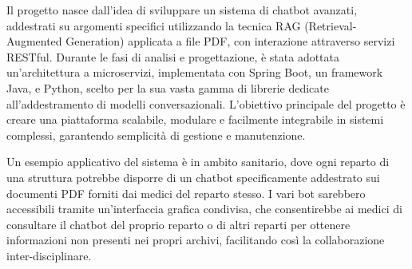\documentclass[a4paper,twoside,12pt]{toptesi}
\begin{document}
Il progetto nasce dall'idea di sviluppare un sistema di chatbot avanzati, addestrati su argomenti specifici utilizzando la tecnica RAG (Retrieval-Augmented Generation) applicata a file PDF, con interazione attraverso servizi RESTful. Durante le fasi di analisi e progettazione, è stata adottata un'architettura a microservizi, implementata con Spring Boot, un framework Java, e Python, scelto per la sua vasta gamma di librerie dedicate all'addestramento di modelli conversazionali. L'obiettivo principale del progetto è creare una piattaforma scalabile, modulare e facilmente integrabile in sistemi complessi, garantendo semplicità di gestione e manutenzione.

Un esempio applicativo del sistema è in ambito sanitario, dove ogni reparto di una struttura potrebbe disporre di un chatbot specificamente addestrato sui documenti PDF forniti dai medici del reparto stesso. I vari bot sarebbero accessibili tramite un'interfaccia grafica condivisa, che consentirebbe ai medici di consultare il chatbot del proprio reparto o di altri reparti per ottenere informazioni non presenti nei propri archivi, facilitando così la collaborazione inter-disciplinare.

\begin{center}


\end{center}
\end{document}
